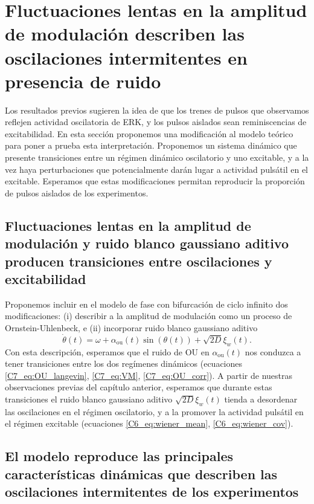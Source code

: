 \documentclass[./main.tex]{subfiles}
\begin{document}
\section{Fluctuaciones lentas en la amplitud de modulación describen las oscilaciones intermitentes en presencia de ruido}
\label{C7_sec:OUD}

Los resultados previos sugieren la idea de que los trenes de pulsos que observamos reflejen actividad oscilatoria de ERK, y los pulsos aislados sean reminiscencias de excitabilidad. En esta sección proponemos una modificación al modelo teórico para poner a prueba esta interpretación. Proponemos un sistema dinámico que presente transiciones entre un régimen dinámico oscilatorio y uno excitable, y a la vez haya perturbaciones que potencialmente darán lugar a actividad pulsátil en el excitable. Esperamos que estas modificaciones permitan reproducir la proporción de pulsos aislados de los experimentos. 


\subsection{Fluctuaciones lentas en la amplitud de modulación y ruido blanco gaussiano aditivo producen transiciones entre oscilaciones y excitabilidad}

Proponemos incluir en el modelo de fase con bifurcación de ciclo infinito dos modificaciones: (i) describir a la amplitud de modulación como un proceso de Ornstein-Uhlenbeck, e (ii) incorporar ruido blanco gaussiano aditivo
\begin{equation}
    \dot{\theta}(t) = \omega + \alpha_{\text{ou}}(t) \sin{(\theta(t))} + \sqrt{2D} \xi_w(t).
    \label{C7_eq:alpha_ou_D}
\end{equation}
Con esta descripción, esperamos que el ruido de OU en $\alpha_{\text{ou}}(t)$ nos conduzca a tener transiciones entre los dos regímenes dinámicos (ecuaciones \ref{C7_eq:OU_langevin}, \ref{C7_eq:VM}, \ref{C7_eq:OU_corr}). A partir de nuestras observaciones previas del capítulo anterior, esperamos que durante estas transiciones el ruido blanco gaussiano aditivo $\sqrt{2D} \xi_w(t)$ tienda a desordenar las oscilaciones en el régimen oscilatorio, y a la promover la actividad pulsátil en el régimen excitable (ecuaciones \ref{C6_eq:wiener_mean}, \ref{C6_eq:wiener_cov}). 


\subsection{El modelo reproduce las principales características dinámicas que describen las oscilaciones intermitentes de los experimentos}
\end{document}
